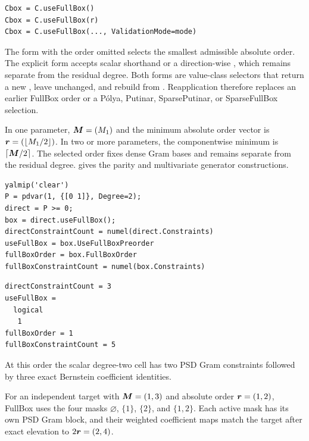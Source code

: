 \syntaxhead
\begin{lstlisting}[style=dpsyntax]
Cbox = C.useFullBox()
Cbox = C.useFullBox(r)
Cbox = C.useFullBox(..., ValidationMode=mode)
\end{lstlisting}

The form with the order omitted selects the smallest admissible absolute order. The explicit form accepts scalar shorthand or a direction-wise , which remains separate from the residual degree. Both forms are value-class selectors that return a new , leave  unchanged, and rebuild from . Reapplication therefore replaces an earlier FullBox order or a P\'olya, Putinar, SparsePutinar, or SparseFullBox selection.

In one parameter, $\boldsymbol{M}=(M_1)$ and the minimum absolute order vector is $\boldsymbol{r}=(\lfloor M_1/2\rfloor)$. In two or more parameters, the componentwise minimum is $\lceil\boldsymbol{M}/2\rceil$. The selected order fixes dense Gram bases and remains separate from the residual degree.  gives the parity and multivariate generator constructions.

\examplehead
\begin{lstlisting}[style=dpmatlab]
yalmip('clear')
P = pdvar(1, {[0 1]}, Degree=2);
direct = P >= 0;
box = direct.useFullBox();
directConstraintCount = numel(direct.Constraints)
useFullBox = box.UseFullBoxPreorder
fullBoxOrder = box.FullBoxOrder
fullBoxConstraintCount = numel(box.Constraints)
\end{lstlisting}

\begin{lstlisting}[style=dpoutput]
directConstraintCount = 3
useFullBox =
  logical
   1
fullBoxOrder = 1
fullBoxConstraintCount = 5
\end{lstlisting}

At this order the scalar degree-two cell has two PSD Gram constraints followed by three exact Bernstein coefficient identities.

 For an independent target with $\boldsymbol{M}=(1,3)$ and absolute order $\boldsymbol{r}=(1,2)$, FullBox uses the four masks $\varnothing$, $\{1\}$, $\{2\}$, and $\{1,2\}$. Each active mask has its own PSD Gram block, and their weighted coefficient maps match the target after exact elevation to $2\boldsymbol{r}=(2,4)$.
\begin{center}
\end{center}

